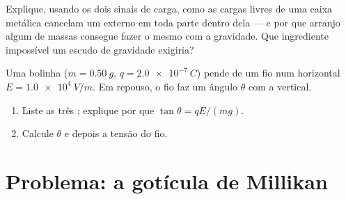 \begin{exercise}[$\star\star\star$]\label{exo:g11:electric-gravitational-fields:14}
Explique, usando os dois sinais de carga, como as cargas livres de uma
caixa metálica cancelam um  externo em toda parte dentro
dela --- e por que arranjo algum de massas consegue fazer o mesmo com a
gravidade. Que ingrediente impossível um escudo de gravidade exigiria?
\end{exercise}

\begin{exercise}[$\star\star\star$]\label{exo:g11:electric-gravitational-fields:15}
Uma bolinha ($m = \qty{0.50}{g}$, $q = \qty{+2.0e-7}{C}$) pende de um fio
num  horizontal $E = \qty{1.0e4}{V/m}$. Em repouso, o fio
faz um ângulo $\theta$ com a vertical.
\begin{enumerate}
  \item Liste as três ; explique por que $\tan\theta = qE / (mg)$.
  \item Calcule $\theta$ e depois a tensão do fio.
\end{enumerate}
\end{exercise}

\section{Problema: a gotícula de Millikan}

